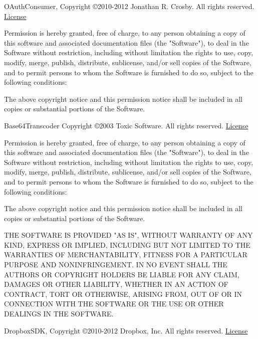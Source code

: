 \documentclass[oneside, openany, 12pt]{tufte-book}
\newcommand{\licensetext}{\scriptsize \setlength{\parskip}{0mm} \singlespacing}
\begin{document}
OAuthConsumer, Copyright \copyright 2010-2012 Jonathan R. Crosby. All rights reserved. \href{http://www.opensource.org/licenses/mit-license.php}{License}

{\licensetext Permission is hereby granted, free of charge, to any person obtaining a copy of this software and associated documentation files (the "Software"), to deal in the Software without restriction, including without limitation the rights to use, copy, modify, merge, publish, distribute, sublicense, and/or sell copies of the Software, and to permit persons to whom the Software is furnished to do so, subject to the following conditions:

The above copyright notice and this permission notice shall be included in all copies or substantial portions of the Software.}

Base64Transcoder Copyright \copyright 2003 Toxic Software. All rights reserved. \href{http://www.opensource.org/licenses/mit-license.php}{License}

{\licensetext Permission is hereby granted, free of charge, to any person obtaining a copy
of this software and associated documentation files (the "Software"), to deal
in the Software without restriction, including without limitation the rights
to use, copy, modify, merge, publish, distribute, sublicense, and/or sell
copies of the Software, and to permit persons to whom the Software is
furnished to do so, subject to the following conditions:

The above copyright notice and this permission notice shall be included in
all copies or substantial portions of the Software.

THE SOFTWARE IS PROVIDED "AS IS", WITHOUT WARRANTY OF ANY KIND, EXPRESS OR
IMPLIED, INCLUDING BUT NOT LIMITED TO THE WARRANTIES OF MERCHANTABILITY,
FITNESS FOR A PARTICULAR PURPOSE AND NONINFRINGEMENT. IN NO EVENT SHALL THE
AUTHORS OR COPYRIGHT HOLDERS BE LIABLE FOR ANY CLAIM, DAMAGES OR OTHER
LIABILITY, WHETHER IN AN ACTION OF CONTRACT, TORT OR OTHERWISE, ARISING FROM,
OUT OF OR IN CONNECTION WITH THE SOFTWARE OR THE USE OR OTHER DEALINGS IN
THE SOFTWARE.}

DropboxSDK, Copyright \copyright 2010-2012 Dropbox, Inc. All rights reserved. \href{http://www.opensource.org/licenses/mit-license.php}{License}
\end{document}
